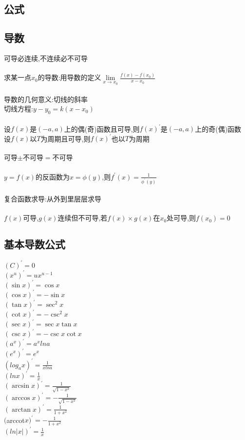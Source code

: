 \documentclass{article}
\begin{document}
\begin{flushleft}
	\huge
	
	\section{公式}
	
	\subsection{导数}
	
	可导必连续,不连续必不可导\\
	~\\
	求某一点$x_0$的导数:用导数的定义$\lim\limits_{x\to x_0} \frac{f(x)-f(x_0
		)}{x-x_0}$\\
	~\\
	导数的几何意义:切线的斜率\\
	切线方程:$y-y_0=k(x-x_0)$\\
	~\\
	设$f(x)$是$(-a,a)$上的偶(奇)函数且可导,则$f(x)^{'}$是$(-a,a)$上的奇(偶)函数\\
	设$f(x)$以$T$为周期且可导,则$f(x)^{'}$也以$T$为周期\\
	~\\
	可导$\pm$不可导$=$不可导\\
	~\\
	$y=f(x)$的反函数为$x=\phi(y)$,则$f^{'}(x)=\frac{1}{\phi^{'}(y)}$\\
	~\\
	复合函数求导:从外到里层层求导\\
	~\\
	$f(x)$可导,$g(x)$连续但不可导,若$f(x)\times g(x)$在$x_0$处可导,则$f(x_0)=0$\\
	
	\subsection{基本导数公式}
	
	$(C)^{'}=0$\\
	$(x^u)^{'}=ux^{u-1}$\\
	$(\sin x)^{'}=\cos x$\\
	$(\cos x)^{'}=-\sin x$\\
	$(\tan x)^{'}=\sec^2 x$\\
	$(\cot x)^{'}=-\csc^2 x$\\
	$(\sec x)^{'}=\sec x\tan x$\\
	$(\csc x)^{'}=-\csc x\cot x$\\
	$(a^x)^{'}=a^xlna$\\
	$(e^x)^{'}=e^x$\\
	$(log_ax)^{'}=\frac{1}{xlna}$\\
	$(lnx)^{'}=\frac{1}{x}$\\
	$(\arcsin x)^{'}=\frac{1}{\sqrt{1-x^2}}$\\
	$(\arccos x)^{'}=-\frac{1}{\sqrt{1-x^2}}$\\
	$(\arctan x)^{'}=\frac{1}{1+x^2}$\\
	$($arccot$ x)^{'}=-\frac{1}{1+x^2}$\\
	$(ln|x|)^{'}=\frac{1}{x}$\\
	

\end{flushleft}
\end{document}
